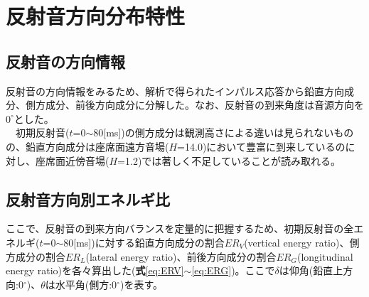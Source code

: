 \chapter{反射音方向分布特性}

\section{反射音の方向情報}
反射音の方向情報をみるため、解析で得られたインパルス応答から鉛直方向成分、側方成分、前後方向成分に分解した。なお、反射音の到来角度は音源方向を$0^\circ$とした。
\\　初期反射音($t$=0$\sim$80[ms])の側方成分は観測高さによる違いは見られないものの、鉛直方向成分は座席面遠方音場($H$=14.0)において豊富に到来しているのに対し、座席面近傍音場($H$=1.2)では著しく不足していることが読み取れる。



\section{反射音方向別エネルギ比}
ここで、反射音の到来方向バランスを定量的に把握するため、初期反射音の全エネルギ($t$=0$\sim$80[ms])に対する鉛直方向成分の割合$ER_V$(vertical energy ratio)、側方成分の割合$ER_L$(lateral energy ratio)、前後方向成分の割合$ER_G$(longitudinal energy ratio)を各々算出した(\textbf{式}\ref{eq:ERV}$\sim$\ref{eq:ERG})。ここで$\delta$は仰角(鉛直上方向:0$^\circ$)、$\theta$は水平角(側方:0$^\circ$)を表す。

